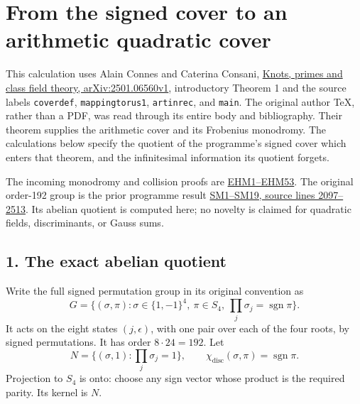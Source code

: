 \documentclass[
  10pt,
  a4paper,
]{article}
\author{}
\date{}
\begin{document}
{
\setcounter{tocdepth}{3}
\tableofcontents
}
\section{From the signed cover to an arithmetic quadratic
cover}\label{from-the-signed-cover-to-an-arithmetic-quadratic-cover}

This calculation uses Alain Connes and Caterina Consani,
\href{https://arxiv.org/abs/2501.06560v1}{Knots, primes and class field
theory, arXiv:2501.06560v1}, introductory Theorem 1 and the source
labels \texttt{coverdef}, \texttt{mappingtorus1}, \texttt{artinrec}, and
\texttt{main}. The original author TeX, rather than a PDF, was read
through its entire body and bibliography. Their theorem supplies the
arithmetic cover and its Frobenius monodromy. The calculations below
specify the quotient of the programme's signed cover which enters that
theorem, and the infinitesimal information its quotient forgets.

The incoming monodromy and collision proofs are
\href{https://github.com/KokunoYumeto/zeta-function-research-reader/blob/adfbfe74fa49e31cb7aa068cf755fb083be37c32/workbenches/splitzero-tandem/branches/tau-zero-prime-positivity/EIGHT_STATE_HOLONOMY_DERIVATION.md}{EHM1--EHM53}.
The original order-192 group is the prior programme result
\href{https://github.com/KokunoYumeto/zeta-function-research-reader/blob/ab45e221579a0d48ce2885b4ecdf1a6aefc24a20/workbenches/splitzero-tandem/continuations/20260920-fable-boundary-action/FABLE_TO_ORIGINAL_CONDUCTOR.tex\#L2097}{SM1--SM19,
source lines 2097--2513}. Its abelian quotient is computed here; no
novelty is claimed for quadratic fields, discriminants, or Gauss sums.

\subsection{1. The exact abelian
quotient}\label{the-exact-abelian-quotient}

Write the full signed permutation group in its original convention as \[
G=\{(\sigma,\pi):\sigma\in\{1,-1\}^4,\ \pi\in S_4,
\ \prod_j\sigma_j=\operatorname{sgn}\pi\}.
\tag{CBR1}
\] It acts on the eight states \((j,\epsilon)\), with one pair over each
of the four roots, by signed permutations. It has order
\(8\cdot24=192\). Let \[
N=\{(\sigma,1):\prod_j\sigma_j=1\},\qquad
\chi_{\mathrm{disc}}(\sigma,\pi)=\operatorname{sgn}\pi.
\tag{CBR2}
\] Projection to \(S_4\) is onto: choose any sign vector whose product
is the required parity. Its kernel is \(N\).
\end{document}
